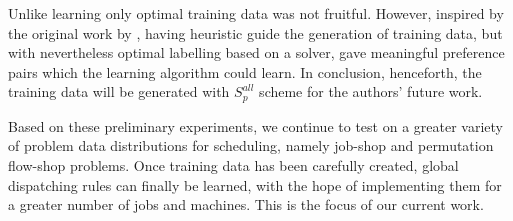 \documentclass[smallextended]{llncs}
\begin{document}
Unlike \cite{Siggi10,Malik08,Russell09} learning only optimal training data was not fruitful. However, inspired by the original work by \cite{Siggi05}, having heuristic guide the generation of training data, but with nevertheless optimal labelling based on a solver, gave meaningful preference pairs which the learning algorithm could learn. In conclusion, henceforth, the training data will be generated with $S_{p}^{all}$ scheme for the authors' future work.

Based on these preliminary experiments, we continue to test on a greater variety of problem data distributions for scheduling, namely job-shop and permutation flow-shop problems. Once training data has been carefully created, global dispatching rules can finally be learned, with the hope of implementing them for a greater number of jobs and machines. This is the focus of our current work.
 
 

 
\end{document}
